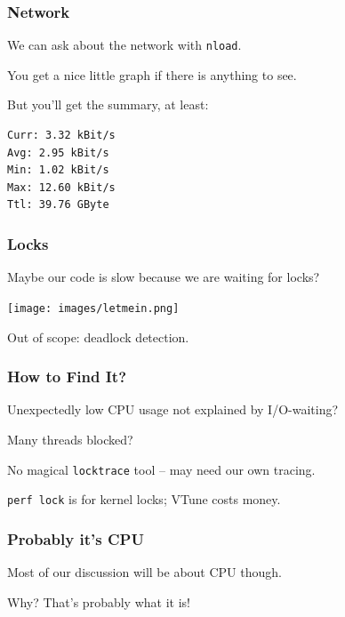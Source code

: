 \begin{frame}[fragile]
\frametitle{Network}


\begin{changemargin}{1cm}
We can ask about the network with \texttt{nload}. 
 
You get a nice little graph if there is anything to see. 

But you'll get the summary, at least:

\begin{verbatim}
Curr: 3.32 kBit/s
Avg: 2.95 kBit/s
Min: 1.02 kBit/s
Max: 12.60 kBit/s
Ttl: 39.76 GByte                                                                                       \end{verbatim}
\end{changemargin}
\end{frame}


\begin{frame}
\frametitle{Locks}

Maybe our code is slow because we are waiting for locks?

\begin{center}
	\texttt{[image: images/letmein.png]}
\end{center}

Out of scope: deadlock detection.

\end{frame}


\begin{frame}
\frametitle{How to Find It?}

Unexpectedly low CPU usage not explained by I/O-waiting?

Many threads blocked?

No magical \texttt{locktrace} tool -- may need our own tracing.

\texttt{perf lock} is for kernel locks; VTune costs money.

\end{frame}


\begin{frame}
\frametitle{Probably it's CPU}

Most of our discussion will be about CPU though.

Why? That's probably what it is!


\end{frame}



